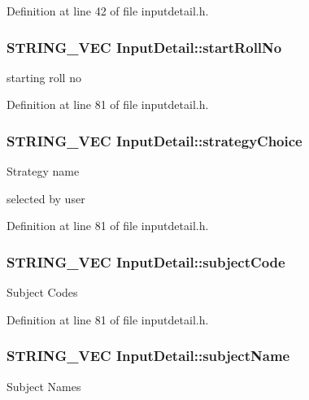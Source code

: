 Definition at line 42 of file inputdetail.\-h.

\hypertarget{classInputDetail_a7262436753ac62bf068cc23b97049f61}{
\subsubsection[{start\-Roll\-No}]{\setlength{\rightskip}{0pt plus 5cm}S\-T\-R\-I\-N\-G\-\_\-\-V\-E\-C Input\-Detail\-::start\-Roll\-No\hspace{0.3cm}{\ttfamily [protected]}}}\label{classInputDetail_a7262436753ac62bf068cc23b97049f61}
starting roll no 

Definition at line 81 of file inputdetail.\-h.

\hypertarget{classInputDetail_acbdbb6ecb850dec574b5878764c56c88}{
\subsubsection[{strategy\-Choice}]{\setlength{\rightskip}{0pt plus 5cm}S\-T\-R\-I\-N\-G\-\_\-\-V\-E\-C Input\-Detail\-::strategy\-Choice\hspace{0.3cm}{\ttfamily [protected]}}}\label{classInputDetail_acbdbb6ecb850dec574b5878764c56c88}
\begin{DoxyVerb}  Strategy name 
\end{DoxyVerb}
 selected by user 

Definition at line 81 of file inputdetail.\-h.

\hypertarget{classInputDetail_ab391f03f242defb952e24a584eefdb35}{
\subsubsection[{subject\-Code}]{\setlength{\rightskip}{0pt plus 5cm}S\-T\-R\-I\-N\-G\-\_\-\-V\-E\-C Input\-Detail\-::subject\-Code\hspace{0.3cm}{\ttfamily [protected]}}}\label{classInputDetail_ab391f03f242defb952e24a584eefdb35}
Subject Codes 

Definition at line 81 of file inputdetail.\-h.

\hypertarget{classInputDetail_a860676e6e8b258a4cf6265e693194e93}{
\subsubsection[{subject\-Name}]{\setlength{\rightskip}{0pt plus 5cm}S\-T\-R\-I\-N\-G\-\_\-\-V\-E\-C Input\-Detail\-::subject\-Name\hspace{0.3cm}{\ttfamily [protected]}}}\label{classInputDetail_a860676e6e8b258a4cf6265e693194e93}
Subject Names 

